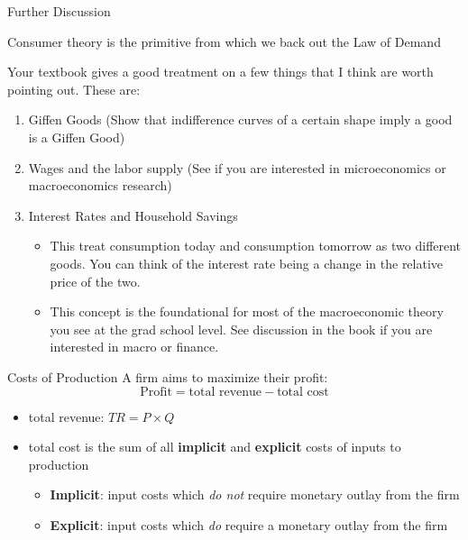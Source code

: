 \documentclass[compress]{beamer}
\begin{document}
\begin{frame}{Further Discussion}

    Consumer theory is the primitive from which we back out the Law of Demand

    \vspace{3pt}

    Your textbook gives a good treatment on a few things that I think are worth pointing out. These are:
    \begin{enumerate}
        \item Giffen Goods (Show that indifference curves of a certain shape imply a good is a Giffen Good)
        \item Wages and the labor supply (See if you are interested in microeconomics or macroeconomics research)
        \item Interest Rates and Household Savings
        \begin{itemize}
            \item This treat consumption today and consumption tomorrow as two different goods. You can think of the interest rate being a change in the relative price of the two. 
            \item This concept is the foundational for most of the macroeconomic theory you see at the grad school level. See discussion in the book if you are interested in macro or finance.
        \end{itemize}
    \end{enumerate}

\end{frame}

\begin{frame}{Costs of Production}
    A firm aims to maximize their profit:
    \[\text{Profit} = \text{total revenue} - \text{total cost}\]
\begin{itemize}
    \item total revenue: \(TR = P \times Q\)
    \item total cost is the sum of all \textbf{implicit} and \textbf{explicit} costs of inputs to production
    \begin{itemize}
        \item \textbf{Implicit}: input costs which \textit{do not} require monetary outlay from the firm
        \item  \textbf{Explicit}: input costs which \textit{do} require a monetary outlay from the firm
    \end{itemize}
\end{itemize}
\end{frame}
\end{document}

